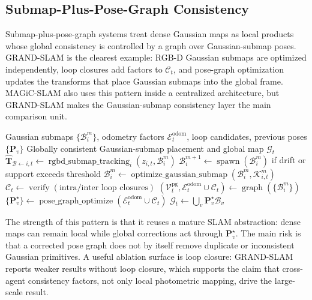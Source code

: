 \documentclass[11pt, a4paper, logo]{googledeepmind}
\begin{document}
\subsection{Submap-Plus-Pose-Graph Consistency}

Submap-plus-pose-graph systems treat dense Gaussian maps as local products whose global consistency is controlled by a graph over Gaussian-submap poses. GRAND-SLAM is the clearest example: RGB-D Gaussian submaps are optimized independently, loop closures add factors to $\mathcal{C}_t$, and pose-graph optimization updates the transforms that place Gaussian submaps into the global frame. MAGiC-SLAM also uses this pattern inside a centralized architecture, but GRAND-SLAM makes the Gaussian-submap consistency layer the main comparison unit.

\begin{algorithm}[H]
\caption{Submap-plus-pose-graph consistency pattern}
\label{alg:taxonomy-submap-pose-graph}
\small
\begin{algorithmic}[1]
  \Require Gaussian submaps $\{\mathcal{B}_{i}^{m}\}$, odometry factors $\mathcal{E}^{\mathrm{odom}}_t$, loop candidates, previous poses $\{\mathbf{P}_v\}$
  \Ensure Globally consistent Gaussian-submap placement and global map $\mathcal{G}_t$
  \State $\hat{\mathbf{T}}_{\mathcal{B}\leftarrow i,t} \gets \operatorname{rgbd\_submap\_tracking}_i(z_{i,t},\mathcal{B}_{i}^{m})$ 
  \State $\mathcal{B}_{i}^{m+1} \gets \operatorname{spawn}(\mathcal{B}_{i}^{m})$ if drift or support exceeds threshold 
  \State $\mathcal{B}_{i}^{m} \gets \operatorname{optimize\_gaussian\_submap}(\mathcal{B}_{i}^{m},\mathcal{K}_{i,t}^{m})$ 
  \State $\mathcal{C}_t \gets \operatorname{verify}(\text{intra/inter loop closures})$ 
  \State $(\mathcal{V}_t^{\mathrm{pg}},\mathcal{E}^{\mathrm{odom}}_t\cup\mathcal{C}_t) \gets \operatorname{graph}(\{\mathcal{B}_{i}^{m}\})$ 
  \State $\{\mathbf{P}_v^\star\} \gets \operatorname{pose\_graph\_optimize}(\mathcal{E}^{\mathrm{odom}}_t\cup\mathcal{C}_t)$ 
  \State $\mathcal{G}_t \gets \bigcup_v\mathbf{P}_v^\star\mathcal{B}_v$ 
\end{algorithmic}
\end{algorithm}

The strength of this pattern is that it reuses a mature SLAM abstraction: dense maps can remain local while global corrections act through $\mathbf{P}_v^\star$. The main risk is that a corrected pose graph does not by itself remove duplicate or inconsistent Gaussian primitives. A useful ablation surface is loop closure: GRAND-SLAM reports weaker results without loop closure, which supports the claim that cross-agent consistency factors, not only local photometric mapping, drive the large-scale result.
\end{document}
